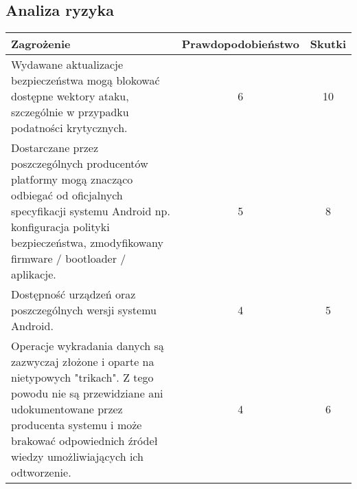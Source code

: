 \subsection{Analiza ryzyka}
\begin{tabular}{|p{9cm}|c|c|}
\hline
    \textbf{Zagrożenie} &
    \textbf{Prawdopodobieństwo} &
    \textbf{Skutki} \\ 
\hline
    Wydawane aktualizacje bezpieczeństwa mogą blokować dostępne wektory ataku, szczególnie w przypadku podatności
    krytycznych. &
    6 &
    10 \\
\hline
    Dostarczane przez poszczególnych producentów platformy mogą znacząco odbiegać od oficjalnych specyfikacji systemu
    Android np. konfiguracja polityki bezpieczeństwa, zmodyfikowany firmware / bootloader / aplikacje. &
    5 &
    8 \\
\hline
    Dostępność urządzeń oraz poszczególnych wersji systemu Android. &
    4 &
    5 \\
\hline
    Operacje wykradania danych są zazwyczaj złożone i oparte na nietypowych "trikach". Z tego powodu nie są przewidziane
    ani udokumentowane przez producenta systemu i może brakować odpowiednich źródeł wiedzy umożliwiających ich
    odtworzenie. &
    4 &
    6 \\
    \hline
\end{tabular}
